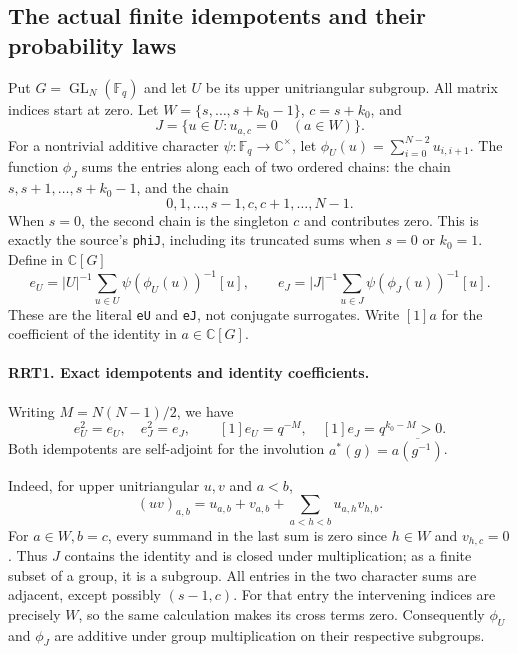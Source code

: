\documentclass[11pt,a4paper]{article}
\numberwithin{equation}{section}
\theoremstyle{remark}\newtheorem{remark}[theorem]{Remark}
\begin{document}
\subsection{The actual finite idempotents and their probability laws}

Put $G=\operatorname{GL}_N(\mathbb F_q)$ and let $U$ be its upper
unitriangular subgroup.  All matrix indices start at zero.  Let
$W=\{s,\ldots,\allowbreak{} s+k_0-1\}$, $c=s+k_0$, and
\[
 J=\{u\in U:u_{a,\allowbreak{} c}=0\quad(a\in W)\}.
 \tag{RRT.1}
\]
For a nontrivial additive character $\psi:\mathbb F_q\to\mathbb C^\times$,
let $\phi_U(u)=\sum_{i=0}^{N-2}u_{i,\allowbreak{} i+1}$.
The function $\phi_J$ sums the entries along each of two ordered
chains: the chain $s,\allowbreak{} s+1,\ldots,\allowbreak{} s+k_0-1$, and the chain
\[
                  0,1,\ldots,\allowbreak{} s-1,\allowbreak{} c,\allowbreak{} c+1,\ldots,\allowbreak{} N-1.
\]
When $s=0$, the second chain is the singleton $c$ and contributes
zero.  This is exactly the source's \texttt{phi\allowbreak J}, including its
truncated sums when $s=0$ or $k_0=1$.  Define in $\mathbb C[G]$
\[
 e_U=|U|^{-1}\sum_{u\in U}\psi(\phi_U(u))^{-1}[u],\qquad
 e_J=|J|^{-1}\sum_{u\in J}\psi(\phi_J(u))^{-1}[u].
 \tag{RRT.2}
\]
These are the literal \texttt{e\allowbreak U} and \texttt{e\allowbreak J}, not conjugate
surrogates.  Write $[1]a$ for the coefficient of the identity in
$a\in\mathbb C[G]$.

\paragraph{RRT1. Exact idempotents and identity coefficients.}
\label{claim:RRT1}
Writing $M=N(N-1)/2$, we have
\[
 e_U^2=e_U,\quad e_J^2=e_J,\qquad
 [1]e_U=q^{-M},\quad [1]e_J=q^{k_0-M}>0.
 \tag{RRT.3}
\]
Both idempotents are self-adjoint for the involution
$a^*(g)=\overline{a(g^{-1})}$.

Indeed, for upper unitriangular $u,\allowbreak{} v$ and $a<b$,
\[
 (uv)_{a,\allowbreak{} b}=u_{a,\allowbreak{} b}+v_{a,\allowbreak{} b}
                  +\sum_{a<h<b}u_{a,\allowbreak{} h}v_{h,\allowbreak{} b}.
 \tag{RRT.4}
\]
For $a\in W,\allowbreak{} b=c$, every summand in the last sum is zero since
$h\in W$ and $v_{h,\allowbreak{} c}=0$.  Thus $J$ contains the identity and is
closed under multiplication; as a finite subset of a group, it is a
subgroup.  All entries in the two character sums are adjacent,
except possibly $(s-1,\allowbreak{} c)$.  For that entry the intervening indices
are precisely $W$, so the same calculation makes its cross terms
zero.  Consequently $\phi_U$ and $\phi_J$ are additive under
group multiplication on their respective subgroups.
\end{document}

